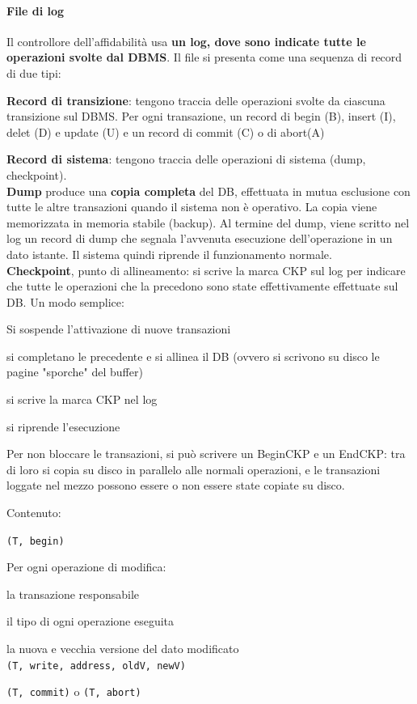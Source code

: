 \documentclass[10pt]{book}
\begin{document}
\paragraph{File di log} Il controllore dell'affidabilità usa \textbf{un log, dove sono indicate tutte le operazioni svolte dal DBMS}. Il file si presenta come una sequenza di record di due tipi:
\begin{list}{}{}
	\item \textbf{Record di transizione}: tengono traccia delle operazioni svolte da ciascuna transizione sul DBMS. Per ogni transazione, un record di begin (B), insert (I), delet (D) e update (U) e un record di commit (C) o di abort(A)
	\item \textbf{Record di sistema}: tengono traccia delle operazioni di sistema (dump, checkpoint).\\
	\textbf{Dump} produce una \textbf{copia completa} del DB, effettuata in mutua esclusione con tutte le altre transazioni quando il sistema non è operativo. La copia viene memorizzata in memoria stabile (backup). Al termine del dump, viene scritto nel log un record di dump che segnala l'avvenuta esecuzione dell'operazione in un dato istante. Il sistema quindi riprende il funzionamento normale.\\
	\textbf{Checkpoint}, punto di allineamento: si scrive la marca CKP sul log per indicare che tutte le operazioni che la precedono sono state effettivamente effettuate sul DB. Un modo semplice:
	\begin{list}{}{}
		\item Si sospende l'attivazione di nuove transazioni
		\item si completano le precedente e si allinea il DB (ovvero si scrivono su disco le pagine "sporche" del buffer)
		\item si scrive la marca CKP nel log
		\item si riprende l'esecuzione
	\end{list}
	Per non bloccare le transazioni, si può scrivere un BeginCKP e un EndCKP: tra di loro si copia su disco in parallelo alle normali operazioni, e le transazioni loggate nel mezzo possono essere o non essere state copiate su disco.
\end{list}
Contenuto:
\begin{list}{}{}
	\item \texttt{(T, begin)}
	\item Per ogni operazione di modifica:
	\begin{list}{}{}
		\item la transazione responsabile
		\item il tipo di ogni operazione eseguita
		\item la nuova e vecchia versione del dato modificato\\
		\texttt{(T, write, address, oldV, newV)}
	\end{list}
	\item \texttt{(T, commit)} o \texttt{(T, abort)}
\end{list}
\end{document}

